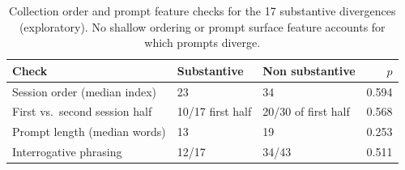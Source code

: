 \begin{table}[htbp]
\centering
\caption[Collection order and prompt feature checks]{Collection order and prompt feature checks for the 17 substantive divergences (exploratory). No shallow ordering or prompt surface feature accounts for which prompts diverge.}
\label{tab:order-feature-checks}
\small
\begin{tabular}{lllr}
\toprule
Check & Substantive & Non substantive & $p$ \\
\midrule
Session order (median index) & 23 & 34 & 0.594 \\
First vs.\ second session half & 10/17 first half & 20/30 of first half & 0.568 \\
Prompt length (median words) & 13 & 19 & 0.253 \\
Interrogative phrasing & 12/17 & 34/43 & 0.511 \\
\bottomrule
\end{tabular}
\end{table}
